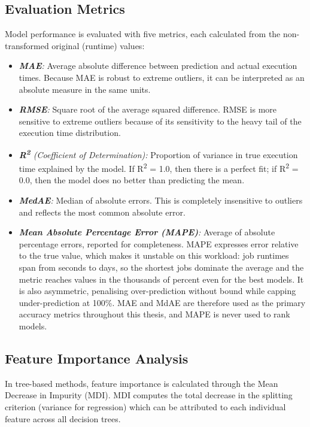 \clearpage

\subsection{Evaluation Metrics}

Model performance is evaluated with five metrics, each calculated from the non-transformed original (runtime) values:

\begin{itemize}
    \item \textit{\textbf{MAE}:} Average absolute difference between prediction and actual execution times. Because MAE is robust to extreme outliers, it can be interpreted as an absolute measure in the same units.
    \item \textit{\textbf{RMSE}:} Square root of the average squared difference. RMSE is more sensitive to extreme outliers because of its sensitivity to the heavy tail of the execution time distribution.
    \item \textit{\textbf{R\textsuperscript{2}} (Coefficient of Determination):} Proportion of variance in true execution time explained by the model. If R\textsuperscript{2} = 1.0, then there is a perfect fit; if R\textsuperscript{2} = 0.0, then the model does no better than predicting the mean.
    \item \textit{\textbf{MedAE}:} Median of absolute errors. This is completely insensitive to outliers and reflects the most common absolute error.
    \item \textit{\textbf{Mean Absolute Percentage Error (MAPE)}:} Average of absolute percentage errors, reported for completeness. MAPE expresses error relative to the true value, which makes it unstable on this workload: job runtimes span from seconds to days, so the shortest jobs dominate the average and the metric reaches values in the thousands of percent even for the best models. It is also asymmetric, penalising over-prediction without bound while capping under-prediction at 100\%. MAE and MdAE are therefore used as the primary accuracy metrics throughout this thesis, and MAPE is never used to rank models.
\end{itemize}

\clearpage
\subsection{Feature Importance Analysis}

In tree-based methods, feature importance is calculated through the Mean Decrease in Impurity (MDI). MDI computes the total decrease in the splitting criterion (variance for regression) which can be attributed to each individual feature across all decision trees.

